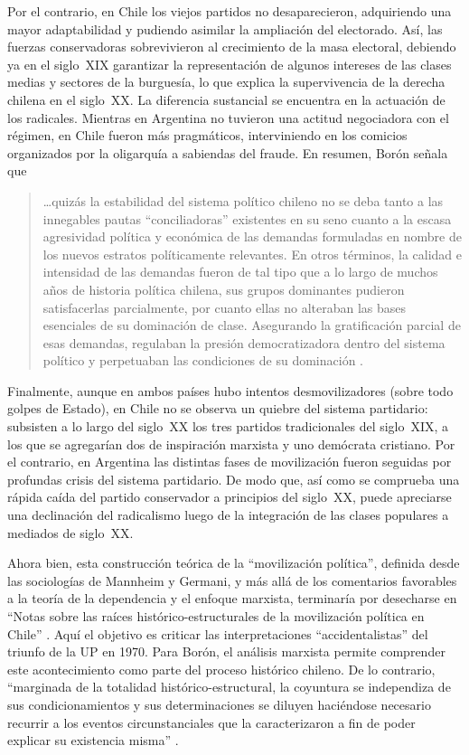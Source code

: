 Por el contrario, en Chile los viejos partidos no desaparecieron, adquiriendo una mayor adaptabilidad y pudiendo asimilar la ampliación del electorado. Así, las fuerzas conservadoras sobrevivieron al crecimiento de la masa electoral, debiendo ya en el siglo~XIX garantizar la representación de algunos intereses de las clases medias y sectores de la burguesía, lo que explica la supervivencia de la derecha chilena en el siglo~XX. La diferencia sustancial se encuentra en la actuación de los radicales. Mientras en Argentina no tuvieron una actitud negociadora con el régimen, en Chile fueron más pragmáticos, interviniendo en los comicios organizados por la oligarquía a sabiendas del fraude. En resumen, Borón señala que

\begin{quote}
\ldots quizás la estabilidad del sistema político chileno no se deba tanto a las innegables pautas \enquote{conciliadoras} existentes en su seno cuanto a la escasa agresividad política y económica de las demandas formuladas en nombre de los nuevos estratos políticamente relevantes. En otros términos, la calidad e intensidad de las demandas fueron de tal tipo que a lo largo de muchos años de historia política chilena, sus grupos dominantes pudieron satisfacerlas parcialmente, por cuanto ellas no alteraban las bases esenciales de su dominación de clase. Asegurando la gratificación parcial de esas demandas, regulaban la presión democratizadora dentro del sistema político y perpetuaban las condiciones de su dominación \parencite[239]{1573-BORON1972}.
\end{quote}

Finalmente, aunque en ambos países hubo intentos desmovilizadores (sobre todo golpes de Estado), en Chile no se observa un quiebre del sistema partidario: subsisten a lo largo del siglo~XX los tres partidos tradicionales del siglo~XIX, a los que se agregarían dos de inspiración marxista y uno demócrata cristiano. Por el contrario, en Argentina las distintas fases de movilización fueron seguidas por profundas crisis del sistema partidario. De modo que, así como se comprueba una rápida caída del partido conservador a principios del siglo~XX, puede apreciarse una declinación del radicalismo luego de la integración de las clases populares a mediados de siglo~XX.

Ahora bien, esta construcción teórica de la \enquote{movilización política}, definida desde las sociologías de Mannheim y Germani, y más allá de los comentarios favorables a la teoría de la dependencia y el enfoque marxista, terminaría por desecharse en \enquote{Notas sobre las raíces histórico-estructurales de la movilización política en Chile} \parencite{1574-BORON1975}. Aquí el objetivo es criticar las interpretaciones \enquote{accidentalistas} del triunfo de la UP en 1970. Para Borón, el análisis marxista permite comprender este acontecimiento como parte del proceso histórico chileno. De lo contrario, \enquote{marginada de la totalidad histórico-estructural, la coyuntura se independiza de sus condicionamientos y sus determinaciones se diluyen haciéndose necesario recurrir a los eventos circunstanciales que la caracterizaron a fin de poder explicar su existencia misma} \parencite[68]{1574-BORON1975}.

